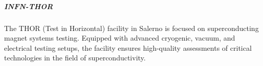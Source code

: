 





\subparagraph{INFN-THOR}

The THOR (Test in Horizontal) facility in Salerno is focused on superconducting magnet systems testing. Equipped with advanced cryogenic, vacuum, and electrical testing setups, the facility ensures high-quality assessments of critical technologies in the field of superconductivity. 

